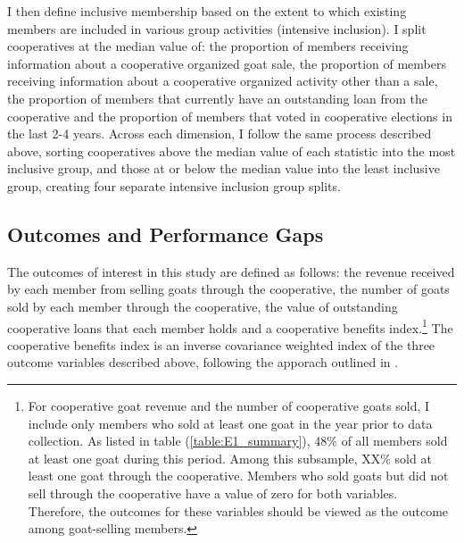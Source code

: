 \documentclass[11pt]{article}
\begin{document}
I then define inclusive membership based on the extent to which existing members are included in various group activities (intensive inclusion). I split cooperatives at the median value of: the proportion of members receiving information about a cooperative organized goat sale, the proportion of members receiving information about a cooperative organized activity other than a sale, the proportion of members that currently have an outstanding loan from the cooperative and the proportion of members that voted in cooperative elections in the last 2-4 years. Across each dimension, I follow the same process described above, sorting cooperatives above the median value of each statistic into the most inclusive group, and those at or below the median value into the least inclusive group, creating four separate intensive inclusion group splits.

\subsection{Outcomes and Performance Gaps}

The outcomes of interest in this study are defined as follows: the revenue received by each member from selling goats through the cooperative, the number of goats sold by each member through the cooperative, the value of outstanding cooperative loans that each member holds and a cooperative benefits index.\footnote{For cooperative goat revenue and the number of cooperative goats sold, I include only members who sold at least one goat in the year prior to data collection. As listed in table (\ref{table:E1_summary}), 48\% of all members sold at least one goat during this period. Among this subsample, XX\% sold at least one goat through the cooperative. Members who sold goats but did not sell through the cooperative have a value of zero for both variables. Therefore, the outcomes for these variables should be viewed as the outcome among goat-selling members.} The cooperative benefits index is an inverse covariance weighted index of the three outcome variables described above, following the apporach outlined in \citet{anderson_multiple_2008}.
\end{document}
